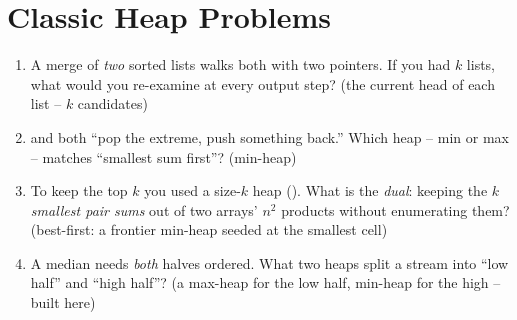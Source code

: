 \section{Classic Heap Problems}\label{sec:c07-classics}

\begin{previouslybox}
\begin{enumerate}[nosep, leftmargin=1.6em]
  \item A merge of \emph{two} sorted lists walks both with two pointers. If you had $k$ lists, what would
        you re-examine at every output step? (the current head of each list -- $k$ candidates)
  \item {} and  both ``pop the extreme, push something back.'' Which
        heap -- min or max -- matches ``smallest sum first''? (min-heap)
  \item To keep the top $k$ you used a size-$k$ heap (). What is the \emph{dual}: keeping
        the $k$ \emph{smallest pair sums} out of two arrays' $n^2$ products without enumerating them?
        (best-first: a frontier min-heap seeded at the smallest cell)
  \item A median needs \emph{both} halves ordered. What two heaps split a stream into ``low half'' and
        ``high half''? (a max-heap for the low half, min-heap for the high -- built here)
\end{enumerate}
\end{previouslybox}

